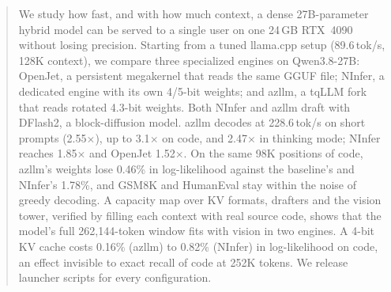 \begin{abstract}
We study how fast, and with how much context, a dense 27B-parameter hybrid model can be served
to a single user on one 24\,GB RTX~4090 without losing precision. Starting from a tuned
llama.cpp setup (89.6\,tok/s, 128K context), we compare three specialized engines on
Qwen3.8-27B: OpenJet, a persistent megakernel that reads the same GGUF file; NInfer, a dedicated
engine with its own 4/5-bit weights; and azllm, a tqLLM fork that reads rotated 4.3-bit weights.
Both NInfer and azllm draft with DFlash2, a block-diffusion model. azllm decodes at
228.6\,tok/s on short prompts (2.55$\times$), up to 3.1$\times$ on code, and 2.47$\times$ in
thinking mode; NInfer reaches 1.85$\times$ and OpenJet 1.52$\times$. On the same 98K positions
of code, azllm's weights lose 0.46\% in log-likelihood against the baseline's and NInfer's
1.78\%, and GSM8K and HumanEval stay within the noise of greedy decoding. A capacity map over KV
formats, drafters and the vision tower, verified by filling each context with real source code,
shows that the model's full 262{,}144-token window fits with vision in two engines. A 4-bit KV
cache costs 0.16\% (azllm) to 0.82\% (NInfer) in log-likelihood on code, an effect invisible to
exact recall of code at 252K tokens. We release launcher scripts for every configuration.
\end{abstract}
